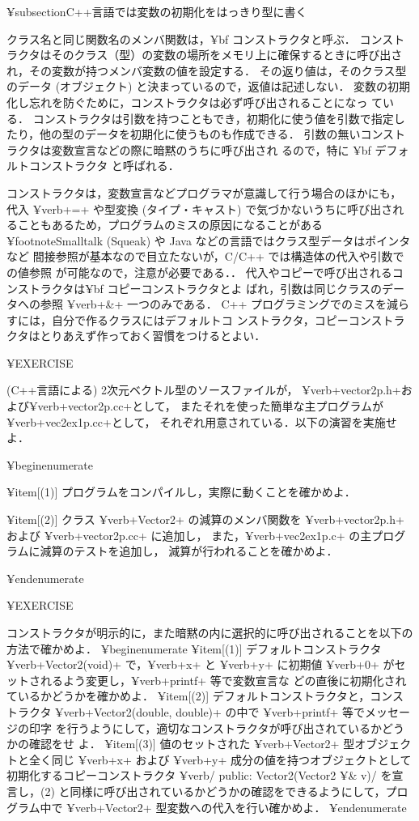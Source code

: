 {{{{{¥subsection{C++言語では変数の初期化をはっきり型に書く}

クラス名と同じ関数名のメンバ関数は，{¥bf コンストラクタ}と呼ぶ．
コンストラクタはそのクラス（型）の変数の場所をメモリ上に確保するときに呼び出され，その変数が持つメンバ変数の値を設定する．
その返り値は，そのクラス型のデータ (オブジェクト) と決まっているので，返値は記述しない．
変数の初期化し忘れを防ぐために，コンストラクタは必ず呼び出されることになっ
ている．
コンストラクタは引数を持つこともでき，初期化に使う値を引数で指定したり，他の型のデータを初期化に使うものも作成できる．
引数の無いコンストラクタは変数宣言などの際に暗黙のうちに呼び出され
るので，特に {¥bf デフォルトコンストラクタ} と呼ばれる．

コンストラクタは，変数宣言などプログラマが意識して行う場合のほかにも，
代入 ¥verb+=+ や型変換 (タイプ・キャスト) で気づかないうちに呼び出されることもあるため，プログラムのミスの原因になることがある¥footnote{Smalltalk (Squeak) や Java などの言語ではクラス型データはポインタなど
間接参照が基本なので目立たないが，C/C++ では構造体の代入や引数での値参照
が可能なので，注意が必要である．}．
代入やコピーで呼び出されるコンストラクタは{¥bf コピーコンストラクタ}とよ
ばれ，引数は同じクラスのデータへの参照 ¥verb+&+ 一つのみである．
C++ プログラミングでのミスを減らすには，自分で作るクラスにはデフォルトコ
ンストラクタ，コピーコンストラクタはとりあえず作っておく習慣をつけるとよい．

¥EXERCISE{
(C++言語による) 2次元ベクトル型のソースファイルが，
¥verb+vector2p.h+および¥verb+vector2p.cc+として，
またそれを使った簡単な主プログラムが¥verb+vec2ex1p.cc+として，
それぞれ用意されている．以下の演習を実施せよ．

¥begin{enumerate}

¥item[(1)] プログラムをコンパイルし，実際に動くことを確かめよ．

¥item[(2)] クラス ¥verb+Vector2+ の減算のメンバ関数を
¥verb+vector2p.h+ および ¥verb+vector2p.cc+ に追加し，
また，¥verb+vec2ex1p.c+ の主プログラムに減算のテストを追加し，
減算が行われることを確かめよ．


¥end{enumerate}

}

¥EXERCISE{
コンストラクタが明示的に，また暗黙の内に選択的に呼び出されることを以下の
方法で確かめよ．
¥begin{enumerate}
¥item[(1)] 
デフォルトコンストラクタ ¥verb+Vector2(void)+ で，¥verb+x+ と ¥verb+y+
に初期値 ¥verb+0+ がセットされるよう変更し，¥verb+printf+ 等で変数宣言な
	   どの直後に初期化されているかどうかを確かめよ．
¥item[(2)] 
デフォルトコンストラクタと，コンストラクタ
¥verb+Vector2(double, double)+ の中で ¥verb+printf+ 等でメッセージの印字
を行うようにして，適切なコンストラクタが呼び出されているかどうかの確認をせ
よ．
¥item[(3)]
値のセットされた ¥verb+Vector2+ 型オブジェクトと全く同じ ¥verb+x+ および
¥verb+y+ 成分の値を持つオブジェクトとして初期化するコピーコンストラクタ 
¥verb/ public: Vector2(Vector2 ¥& v)/ 
を宣言し，(2) と同様に呼び出されているかどうかの確認をできるようにして，プログラム中で
¥verb+Vector2+ 型変数への代入を行い確かめよ．
¥end{enumerate}

}}}}}}
